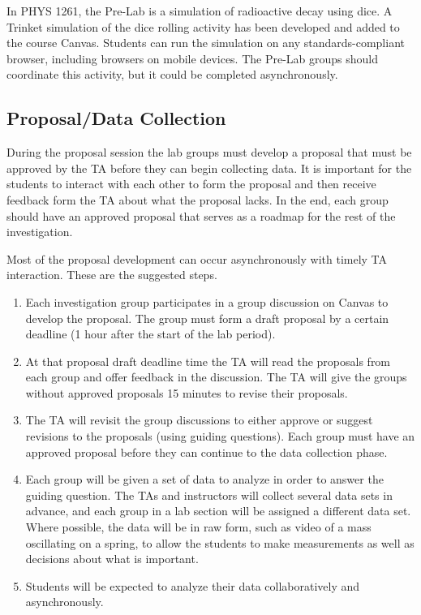 \documentclass[11pt, oneside]{article}
\begin{document}
In PHYS 1261, the Pre-Lab is a simulation of radioactive decay using dice.  A Trinket simulation of the dice rolling activity has been developed and added to the course Canvas.  Students can run the simulation on any standards-compliant browser, including browsers on mobile devices.  The Pre-Lab groups should coordinate this activity, but it could be completed asynchronously.

\subsection{Proposal/Data Collection}

During the proposal session the lab groups must develop a proposal that must be approved by the TA before they can begin collecting data.  It is important for the students to interact with each other to form the proposal and then receive feedback form the TA about what the proposal lacks.  In the end, each group should have an approved proposal that serves as a roadmap for the rest of the investigation.

Most of the proposal development can occur asynchronously with timely TA interaction.  These are the suggested steps.

\begin{enumerate}
\item Each investigation group participates in a group discussion on Canvas to develop the proposal.  The group must form a draft proposal by a certain deadline (1 hour after the start of the lab period).  

\item At that proposal draft deadline time the TA will read the proposals from each group and offer feedback in the discussion. The TA will give the groups without approved proposals 15 minutes to revise their proposals.  

\item The TA will revisit the group discussions to either approve or suggest revisions to the proposals (using guiding questions).  Each group must have an approved proposal before they can continue to the data collection phase.

\item Each group will be given a set of data to analyze in order to answer the guiding question.  The TAs and instructors will collect several data sets in advance, and each group in a lab section will be assigned a different data set.  Where possible, the data will be in raw form, such as video of a mass oscillating on a spring, to allow the students to make measurements as well as decisions about what is important.

\item Students will be expected to analyze their data collaboratively and asynchronously.
\end{enumerate}
\end{document}
